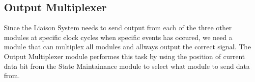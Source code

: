 \subsection{Output Multiplexer}
Since the Liaison System needs to send output from each of the three other modules at specific clock cycles when specific events has occured, we need
a module that can multiplex all modules and allways output the correct signal. The Output Multiplexer module performes this task by using the
position of current data bit from the State Maintainance module to select what module to send data from.
